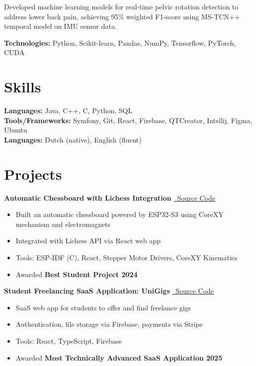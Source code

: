 \documentclass[10pt,a4paper]{article}
\newenvironment{highlights}{\begin{itemize}}{\end{itemize}}
\begin{document}
    \vspace{.2cm}
    Developed machine learning models for real-time pelvic rotation detection to address lower back pain, achieving 95\% weighted F1-score using MS-TCN++ temporal model on IMU sensor data.

    \textbf{Technologies:} Python, Scikit-learn, Pandas, NumPy, Tensorflow, PyTorch, CUDA

    \section{Skills}
    \textbf{Languages:} Java, C++, C, Python, SQL \\
    \textbf{Tools/Frameworks:} Symfony, Git, React, Firebase, QTCreator, Intellij, Figma, Ubuntu \\
    \textbf{Languages:} Dutch (native), English (fluent)

    \section{Projects}

    \textbf{Automatic Chessboard with Lichess Integration} \hfill \href{https://github.com/Yornared/ESP32_Chessboard_code}{\faGithub\ Source Code}
    \begin{highlights}
        \item Built an automatic chessboard powered by ESP32-S3 using CoreXY mechanism and electromagnets
        \item Integrated with Lichess API via React web app
        \item Tools: ESP-IDF (C), React, Stepper Motor Drivers, CoreXY Kinematics
        \item Awarded \textbf{Best Student Project 2024}
    \end{highlights}

    \vspace{0.3cm}

    \textbf{Student Freelancing SaaS Application: UniGigs} \hfill \href{https://github.com/Yornared/FreelanceApp}{\faGithub\ Source Code}
    \begin{highlights}
        \item SaaS web app for students to offer and find freelance gigs
        \item Authentication, file storage via Firebase, payments via Stripe
        \item Tools: React, TypeScript, Firebase
        \item Awarded \textbf{Most Technically Advanced SaaS Application 2025}
    \end{highlights}
\end{document}
